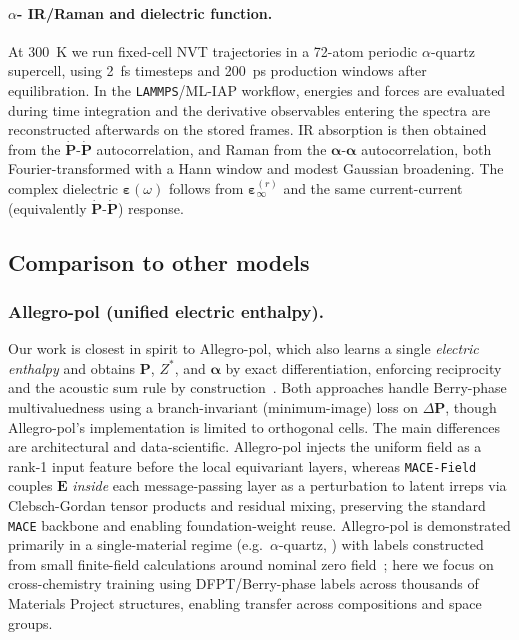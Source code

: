 \documentclass[aps,physrev,graphicx,amsmath,amssymb,
               reprint,superscriptaddress]{revtex4-2}
\begin{document}
\paragraph*{$\alpha$- IR/Raman and dielectric function.}
At 300~\si{K} we run fixed-cell NVT trajectories in a 72-atom periodic $\alpha$-quartz supercell, using 2~fs timesteps and 200~ps production windows after equilibration. In the \texttt{LAMMPS}/ML-IAP workflow, energies and forces are evaluated during time integration and the derivative observables entering the spectra are reconstructed afterwards on the stored frames. IR absorption is then obtained from the $\dot{\mathbf P}$-$\dot{\mathbf P}$ autocorrelation, and Raman from the $\boldsymbol\alpha$-$\boldsymbol\alpha$ autocorrelation, both Fourier-transformed with a Hann window and modest Gaussian broadening. The complex dielectric $\boldsymbol\varepsilon(\omega)$ follows from $\boldsymbol\varepsilon_\infty^{(r)}$ and the same current-current (equivalently $\dot{\mathbf P}$-$\dot{\mathbf P}$) response.


\subsection{Comparison to other models}
\label{sec:compare}

\subsubsection*{Allegro-pol (unified electric enthalpy).}
Our work is closest in spirit to Allegro-pol, which also learns a single \emph{electric enthalpy} and obtains $\mathbf P$, $Z^*$, and $\boldsymbol\alpha$ by exact differentiation, enforcing reciprocity and the acoustic sum rule by construction~\cite{allegro-pol-2025}. Both approaches handle Berry-phase multivaluedness using a branch-invariant (minimum-image) loss on $\Delta\mathbf P$, though Allegro-pol's implementation is limited to orthogonal cells. The main differences are architectural and data-scientific. Allegro-pol injects the uniform field as a rank-1 input feature before the local equivariant layers, whereas \texttt{MACE-Field} couples $\mathbf E$ \emph{inside} each message-passing layer as a perturbation to latent irreps via Clebsch-Gordan tensor products and residual mixing, preserving the standard \texttt{MACE} backbone and enabling foundation-weight reuse. Allegro-pol is demonstrated primarily in a single-material regime (e.g.\ $\alpha$-quartz, ) with labels constructed from small finite-field calculations around nominal zero field~\cite{allegro-pol-2025}; here we focus on cross-chemistry training using DFPT/Berry-phase labels across thousands of Materials Project structures, enabling transfer across compositions and space groups.
\end{document}
